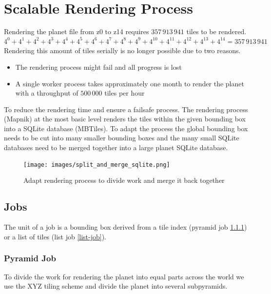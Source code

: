 \chapter{Scalable Rendering Process}

Rendering the planet file from z0 to z14 requires $357\,913\,941$ tiles to be rendered. \\
$4^0+4^1+4^2+4^3+4^4+4^5+4^6+4^7+4^8+4^9+4^{10}+4^{11}+4^{12}+4^{13}+4^{14}=357\,913\,941$ \\

Rendering this amount of tiles serially is no longer possible due to two reasons.

\begin{itemize}
    \item The rendering process might fail and all progress is lost
    \item A single worker process takes approximately one month to render the planet with a throughput of $500\,000$ tiles per hour
\end{itemize}

To reduce the rendering time and ensure a failsafe process. The rendering process (Mapnik)
at the most basic level renders the tiles within the given bounding box into a SQLite database (MBTiles). To adapt the process the global bounding box needs to be cut into many smaller bounding boxes and the many small SQLite databases need to be merged together into a large planet SQLite database.

\begin{figure}[H]
  \centering
  \texttt{[image: images/split\_and\_merge\_sqlite.png]}
  \caption{Adapt rendering process to divide work and merge it back together}
\end{figure}

\section{Jobs}

The unit of a job is a bounding box derived from a tile index (pyramid job \ref{pyramid-job}) or a list of tiles (list job \ref{list-job}).

\subsection{Pyramid Job}\label{pyramid-job}

To divide the work for rendering the planet into equal parts across the world we use the XYZ tiling scheme and divide the planet into several subpyramids.

